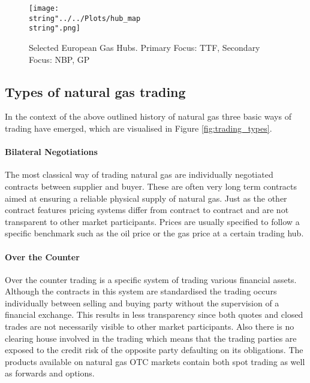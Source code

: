 \begin{figure}[H]
  \centering
\texttt{[image: \\string"../../Plots/hub\_map\\string".png]}
  \caption{Selected European Gas Hubs. Primary Focus: TTF, Secondary Focus: NBP, GP}\label{fig:hub_map}
\end{figure}

\subsection{Types of natural gas trading}
In the context of the above outlined history of natural gas three basic ways of trading have emerged, which are visualised in Figure \ref{fig:trading_types}.

\paragraph{Bilateral Negotiations}
The most classical way of trading natural gas are individually negotiated contracts between supplier and buyer. These are often very long term contracts aimed at ensuring a reliable physical supply of natural gas. Just as the other contract features pricing systems differ from contract to contract and are not transparent to other market participants. Prices are usually specified to follow a specific benchmark such as the oil price or the gas price at a certain trading hub. 

\paragraph{Over the Counter}
Over the counter trading is a specific system of trading various financial assets. Although the contracts in this system are standardised the trading occurs individually between selling and buying party without the supervision of a financial exchange. This results in less transparency since both quotes and closed trades are not necessarily visible to other market participants. Also there is no clearing house involved in the trading which means that the trading parties are exposed to the credit risk of the opposite party defaulting on its obligations. The products available on natural gas OTC markets contain both spot trading as well as forwards and options.

